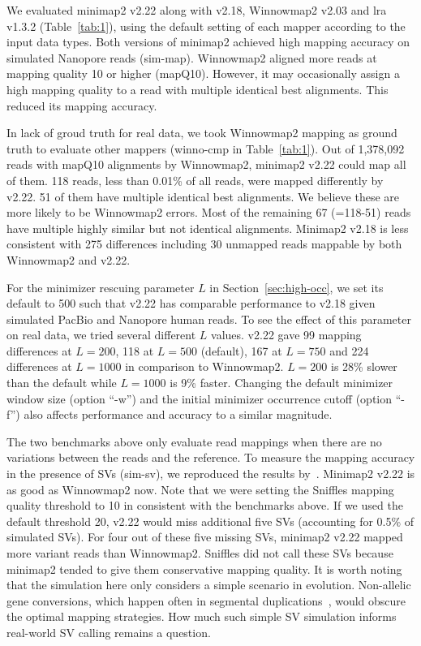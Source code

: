 \documentclass{bioinfo}
\begin{document}
We evaluated minimap2 v2.22 along with v2.18, Winnowmap2 v2.03 and lra v1.3.2
(Table~\ref{tab:1}), using the default setting of each mapper according to the input data types.
Both versions of minimap2 achieved high mapping accuracy on
simulated Nanopore reads (sim-map). Winnowmap2 aligned more reads at mapping
quality 10 or higher (mapQ10). However, it may occasionally assign a high mapping
quality to a read with multiple identical best alignments. This reduced its
mapping accuracy.

In lack of groud truth for real data, we took Winnowmap2 mapping as ground
truth to evaluate other mappers (winno-cmp in Table~\ref{tab:1}). Out of 1,378,092 reads with mapQ10
alignments by Winnowmap2, minimap2 v2.22 could map all of them. 118 reads, less
than 0.01\% of all reads, were mapped differently by v2.22. 51 of them have
multiple identical best alignments. We believe these are more likely to be
Winnowmap2 errors. Most of the remaining 67 (=118-51) reads have multiple
highly similar but not identical alignments.
Minimap2 v2.18 is less consistent with 275 differences including 30 unmapped
reads mappable by both Winnowmap2 and v2.22.

For the minimizer rescuing parameter $L$ in Section~\ref{sec:high-occ},
we set its default to 500 such that v2.22 has comparable performance to v2.18 given simulated PacBio and Nanopore human reads.
To see the effect of this parameter on real data, we tried several different $L$ values.
v2.22 gave 99 mapping differences at $L=200$,
118 at $L=500$ (default), 167 at $L=750$ and 224 differences at $L=1000$ in comparison to Winnowmap2.
$L=200$ is 28\% slower than the default while $L=1000$ is 9\% faster.
Changing the default minimizer window size (option ``-w'')
and the initial minimizer occurrence cutoff (option ``-f'')
also affects performance and accuracy to a similar magnitude.

The two benchmarks above only evaluate read mappings when there are no variations between the reads and the reference.
To measure the mapping accuracy in the presence of SVs (sim-sv), we reproduced
the results by~\citep{Jain2020.11.01.363887}. Minimap2 v2.22 is as good as
Winnowmap2 now. Note that we were setting the Sniffles mapping quality
threshold to 10 in consistent with the benchmarks above. If we used the
default threshold 20, v2.22 would miss additional five SVs (accounting for
0.5\% of simulated SVs). For four out of these five missing SVs, minimap2 v2.22
mapped more variant reads than Winnowmap2. Sniffles did not call these SVs
because minimap2 tended to give them conservative mapping quality. It is worth
noting that the simulation here only considers a simple scenario in evolution.
Non-allelic gene conversions, which happen often in segmental
duplications~\citep{Harpak:2017aa}, would obscure the optimal mapping
strategies. How much such simple SV simulation informs real-world SV calling
remains a question.
\end{document}
